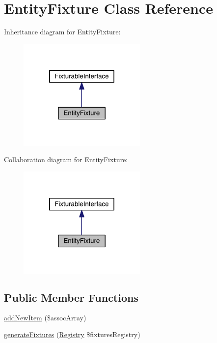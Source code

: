\hypertarget{class_entity_1_1_entity_fixture}{\section{Entity\-Fixture Class Reference}
\label{class_entity_1_1_entity_fixture}
}


Inheritance diagram for Entity\-Fixture\-:
\nopagebreak
\begin{figure}[H]
\begin{center}
\leavevmode
\includegraphics[width=178pt]{class_entity_1_1_entity_fixture__inherit__graph}
\end{center}
\end{figure}


Collaboration diagram for Entity\-Fixture\-:
\nopagebreak
\begin{figure}[H]
\begin{center}
\leavevmode
\includegraphics[width=178pt]{class_entity_1_1_entity_fixture__coll__graph}
\end{center}
\end{figure}
\subsection*{Public Member Functions}
\begin{DoxyCompactItemize}
\item 
\hyperlink{class_entity_1_1_entity_fixture_a4ff07981a68955867c222fc0712e323a}{add\-New\-Item} (\$assoc\-Array)
\item 
\hyperlink{class_entity_1_1_entity_fixture_a60af9abed72c391727622c642cc4c612}{generate\-Fixtures} (\hyperlink{classapp_1_1models_1_1core_1_1_registry}{Registry} \$fixtures\-Registry)
\end{DoxyCompactItemize}
